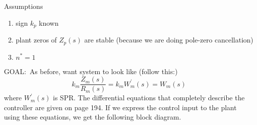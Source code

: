 Assumptions
\begin{enumerate}
  \setlength{\itemsep}{0pt}
  \item{sign $k_{p}$ known}
  \item{plant zeros of $Z_{p}(s)$ are stable (because we are doing pole-zero cancellation)}
  \item{$n^{*}=1$}
\end{enumerate}

GOAL:\ As before, want system to look like (follow this:)
\begin{equation*}
  k_{m}\frac{Z_{m}(s)}{R_{m}(s)}=k_{m}W_{m}^{\prime}(s)=W_{m}(s)
\end{equation*}
where $W_{m}^{\prime}(s)$ is SPR.\@
The differential equations that completely describe the controller are given on page 194.
If we express the control input to the plant using these equations, we get the following block diagram.

